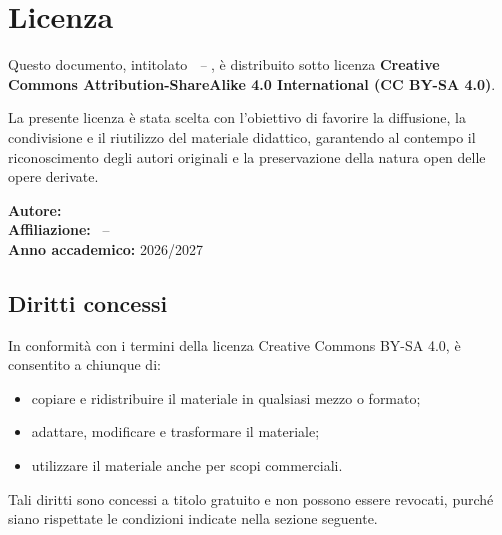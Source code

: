 \chapter*{Licenza}

\setlength{\parskip}{0.8em}
\setlength{\parindent}{0pt}

Questo documento, intitolato \emph{\BookTitle\ -- \BookSubtitle},
è distribuito sotto licenza \textbf{Creative Commons Attribution-ShareAlike 4.0
International (CC BY-SA 4.0)}.

\noindent
La presente licenza è stata scelta con l'obiettivo di favorire la diffusione,
la condivisione e il riutilizzo del materiale didattico, garantendo al contempo
il riconoscimento degli autori originali e la preservazione della natura open
delle opere derivate.

\vspace{0.6em}

\noindent
\sffamily\small\color{TextGray}
\textbf{Autore:} \BookAuthor \\
\textbf{Affiliazione:} \BookUni\ -- \BookDept \\
\textbf{Anno accademico:} 2026/2027\par
\normalfont\normalsize\color{black}

\vspace{1em}

\section*{Diritti concessi}

In conformità con i termini della licenza Creative Commons BY-SA 4.0, è consentito
a chiunque di:
\begin{itemize}
  \item copiare e ridistribuire il materiale in qualsiasi mezzo o formato;
  \item adattare, modificare e trasformare il materiale;
  \item utilizzare il materiale anche per scopi commerciali.
\end{itemize}

Tali diritti sono concessi a titolo gratuito e non possono essere revocati,
purché siano rispettate le condizioni indicate nella sezione seguente.

\vspace{1em}

